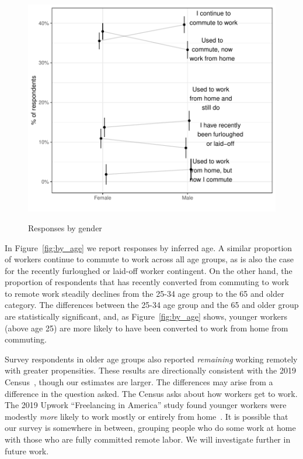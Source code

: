 \documentclass[12pt]{article}
\begin{document}
\begin{figure}
  \caption{Responses by gender} \label{fig:gender}
\centering
\begin{minipage}{1.0 \linewidth}
  \includegraphics[width = \linewidth]{plots/gender.pdf} \\
  \begin{footnotesize}
    \begin{singlespace}
    \end{singlespace}
    \end{footnotesize}
\end{minipage}
\end{figure} 


In Figure~\ref{fig:by_age} we report responses by inferred age.
A similar proportion of workers continue to commute to work across all age groups, as is also the case for the recently furloughed or laid-off worker contingent.
On the other hand, the proportion of respondents that has recently converted from commuting to work to remote work steadily declines from the 25-34 age group to the 65 and older category. The differences between the 25-34 age group and the 65 and older group are statistically significant, and, as Figure~\ref{fig:by_age} shows, younger workers (above age 25) are more likely to have been converted to work from home from commuting. 

Survey respondents in older age groups also reported \emph{remaining} working remotely with greater propensities.
These results are directionally consistent with the 2019 Census~\cite{ACSTableB08101}, though our estimates are larger.
The differences may arise from a difference in the question asked.
The Census asks about how workers get to work. The 2019 Upwork ``Freelancing in America'' study found younger workers were modestly \emph{more} likely to work mostly or entirely from home~\cite{upwork2019}.
It is possible that our survey is somewhere in between, grouping people who do some work at home with those who are fully committed remote labor.
We will investigate further in future work.
\end{document}
